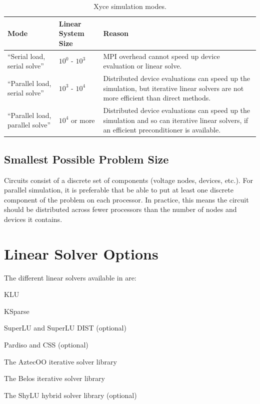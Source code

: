 \begin{table}[htp]
\caption[\Xyce{} Simulation Modes]{Xyce simulation modes.}
\label{tab:sim:modes}
\begin{center}
\begin{tabular}{| p{5cm} | p{3.5cm} | p{7cm} |}
\hline
Mode & Linear System Size & Reason \\
\hline
``Serial load, serial solve'' & $10^0$ - $10^3$ & MPI overhead cannot speed up device evaluation or linear solve. \\
``Parallel load, serial solve'' & $10^3$ - $10^4$ & Distributed device evaluations can speed up the simulation, but 
iterative linear solvers are not more efficient than direct methods.\\
``Parallel load, parallel solve'' & $10^4$ or more & Distributed device evaluations can speed up the simulation and
so can iterative linear solvers, if an efficient preconditioner is available. \\
\hline
\end{tabular}
\end{center}
\end{table}

\subsection{Smallest Possible Problem Size}
Circuits consist of a discrete set of components (voltage nodes, devices, etc.). For parallel simulation, it is preferable that \Xyce{} be able to put 
at least one discrete component of the problem on each processor. In practice, this means the circuit should be distributed across fewer processors than 
the number of nodes and devices it contains.

\section{Linear Solver Options}
\label{LinearSolver_Options}

The different linear solvers available in \Xyce{} are:

\begin{XyceItemize}
  \item KLU
  \item KSparse
  \item SuperLU and SuperLU DIST (optional)
  \item Pardiso and CSS (optional)
  \item The AztecOO iterative solver library
  \item The Belos iterative solver library
  \item The ShyLU hybrid solver library (optional)
\end{XyceItemize}

